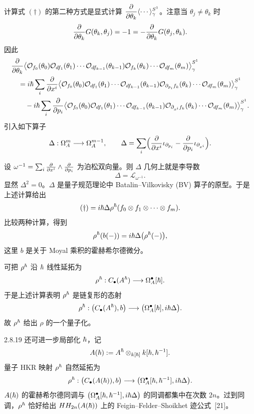 计算式 $(\dagger)$ 的第二种方式是显式计算
$\displaystyle\frac{\partial}{\partial\theta_k}\langle\cdots\rangle_\gamma^{S^1}$。注意当 $\theta_j\ne\theta_k$ 时
\[
\frac{\partial}{\partial\theta_k}G(\theta_k,\theta_j)
=-1=-\frac{\partial}{\partial\theta_k}G(\theta_j,\theta_k).
\]
因此
\[
\begin{aligned}
&\frac{\partial}{\partial\theta_k}
\bigl\langle\mathcal O_{f_0}(\theta_0)\mathcal O_{d f_1}(\theta_1)\cdots
\mathcal O_{d f_{k-1}}(\theta_{k-1})\mathcal O_{f_k}(\theta_k)\cdots
\mathcal O_{d f_m}(\theta_m)\bigr\rangle_\gamma^{S^1}\\
&\quad=i\hbar\sum_i\frac{\partial}{\partial x^i}
\bigl\langle\mathcal O_{f_0}(\theta_0)\mathcal O_{d f_1}(\theta_1)\cdots
\mathcal O_{d f_{k-1}}(\theta_{k-1})\mathcal O_{\partial_{p_i}f_k}(\theta_k)\cdots
\mathcal O_{d f_m}(\theta_m)\bigr\rangle_\gamma^{S^1}\\
&\qquad-i\hbar\sum_i\frac{\partial}{\partial p_i}
\bigl\langle\mathcal O_{f_0}(\theta_0)\mathcal O_{d f_1}(\theta_1)\cdots
\mathcal O_{d f_{k-1}}(\theta_{k-1})\mathcal O_{\partial_{x^i}f_k}(\theta_k)\cdots
\mathcal O_{d f_m}(\theta_m)\bigr\rangle_\gamma^{S^1}.
\end{aligned}
\]
引入如下算子
\[
\Delta:\Omega^m_A\longrightarrow\Omega^{m-1}_A,\qquad
\Delta=\sum_i\Bigl(\frac{\partial}{\partial x^i}\iota_{\partial_{p_i}}
-\frac{\partial}{\partial p_i}\iota_{\partial_{x^i}}\Bigr).
\]

设 $\omega^{-1}=\sum_i\frac{\partial}{\partial x^i}\wedge\frac{\partial}{\partial p_i}$ 为泊松双向量。则 $\Delta$ 几何上就是李导数
\[
\Delta=\mathcal L_{\omega^{-1}}.
\]
显然 $\Delta^2=0$。$\Delta$ 是量子规范理论中 Batalin–Vilkovisky (BV) 算子的原型。于是上述计算给出
\[
(\dagger)=i\hbar\Delta\rho^\hbar(f_0\otimes f_1\otimes\cdots\otimes f_m).
\]
比较两种计算，得到
\[
\rho^\hbar(b(-))=i\hbar\Delta\bigl(\rho^\hbar(-)\bigr),
\]
这里 $b$ 是关于 Moyal 乘积的霍赫希尔德微分。

可把 $\rho^\hbar$ 沿 $\hbar$ 线性延拓为
\[
\rho^\hbar:C_\bullet(A^\hbar)\longrightarrow\Omega^\bullet_A[\hbar].
\]
于是上述计算表明 $\rho^\hbar$ 是链复形的态射
\[
\rho^\hbar:\bigl(C_\bullet(A^\hbar),b\bigr)\longrightarrow
\bigl(\Omega^\bullet_A[\hbar],i\hbar\Delta\bigr).
\]
故 $\rho^\hbar$ 给出 $\rho$ 的一个量子化。

\begin{remark}{2.8.19}
  还可进一步局部化 $\hbar$，记
  \[
  A(\hbar):=A^\hbar\otimes_{k[\hbar]}k[\hbar,\hbar^{-1}].
  \]
  量子 HKR 映射 $\rho^\hbar$ 自然延拓为
  \[
  \rho^\hbar:\bigl(C_\bullet(A(\hbar)),b\bigr)\longrightarrow
  \bigl(\Omega^\bullet_A[\hbar,\hbar^{-1}],i\hbar\Delta\bigr).
  \]
  $A(\hbar)$ 的霍赫希尔德同调与 $\bigl(\Omega^\bullet_A[\hbar,\hbar^{-1}],i\hbar\Delta\bigr)$ 的同调都集中在次数 $2n$。过到同调，$\rho^\hbar$ 恰好给出 $HH_{2n}(A(\hbar))$ 上的 Feigin–Felder–Shoikhet 迹公式~[21]。
\end{remark}

